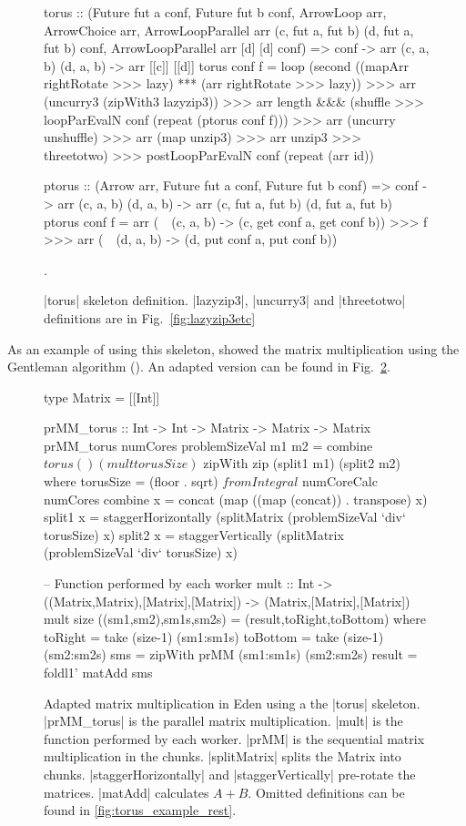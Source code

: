 \begin{figure}[tb]
\begin{code}
torus :: (Future fut a conf, Future fut b conf,
      ArrowLoop arr, ArrowChoice arr,
      ArrowLoopParallel arr (c, fut a, fut b) (d, fut a, fut b) conf,
      ArrowLoopParallel arr [d] [d] conf) =>
      conf -> arr (c, a, b) (d, a, b) -> arr [[c]] [[d]]
torus conf f =
    loop (second ((mapArr rightRotate >>> lazy) *** (arr rightRotate >>> lazy)) >>>
        arr (uncurry3 (zipWith3 lazyzip3)) >>>
        arr length &&& (shuffle >>> loopParEvalN conf (repeat (ptorus conf f))) >>>
        arr (uncurry unshuffle) >>>
        arr (map unzip3) >>> arr unzip3 >>> threetotwo) >>>
    postLoopParEvalN conf (repeat (arr id))

ptorus :: (Arrow arr, Future fut a conf, Future fut b conf) =>
          conf ->
          arr (c, a, b) (d, a, b) ->
          arr (c, fut a, fut b) (d, fut a, fut b)
ptorus conf f =
	arr (\ ~(c, a, b) -> (c, get conf a, get conf b)) >>>
	f >>>
	arr (\ ~(d, a, b) -> (d, put conf a, put conf b))
\end{code} %
\caption{|torus| skeleton definition. |lazyzip3|, |uncurry3| and |threetotwo| definitions are in Fig.~\ref{fig:lazyzip3etc}}.
\label{fig:torus}
\end{figure}
As an example of using this skeleton, \citet{Eden:SkeletonBookChapter02} showed the matrix multiplication using the Gentleman algorithm (\citeyear{Gentleman1978}). An adapted version can be found in Fig.~\ref{fig:torusMatMult}.
\begin{figure}[tb]
\begin{code}
type Matrix = [[Int]]

prMM_torus :: Int -> Int -> Matrix -> Matrix -> Matrix
prMM_torus numCores problemSizeVal m1 m2 = 
	combine $ torus () (mult torusSize) $ zipWith zip (split1 m1) (split2 m2)
    where   torusSize = (floor . sqrt) $ fromIntegral $ numCoreCalc numCores
            combine x = concat (map ((map (concat)) . transpose) x)
            split1 x = staggerHorizontally (splitMatrix (problemSizeVal `div` torusSize) x)
            split2 x = staggerVertically (splitMatrix (problemSizeVal `div` torusSize) x)

-- Function performed by each worker
mult :: Int -> ((Matrix,Matrix),[Matrix],[Matrix]) -> (Matrix,[Matrix],[Matrix])
mult size ((sm1,sm2),sm1s,sm2s) = (result,toRight,toBottom)
    where 	toRight = take (size-1) (sm1:sm1s)
            toBottom = take (size-1) (sm2:sm2s)
            sms = zipWith prMM (sm1:sm1s) (sm2:sm2s)
            result = foldl1' matAdd sms
\end{code} %
\caption{Adapted matrix multiplication in Eden using a the |torus| skeleton. |prMM_torus| is the parallel matrix multiplication. |mult| is the function performed by each worker. |prMM| is the sequential matrix multiplication in the chunks. |splitMatrix| splits the Matrix into chunks. |staggerHorizontally| and |staggerVertically| pre-rotate the matrices. |matAdd| calculates $A + B$. Omitted definitions can be found in \ref{fig:torus_example_rest}. }
\label{fig:torusMatMult}
\end{figure}
